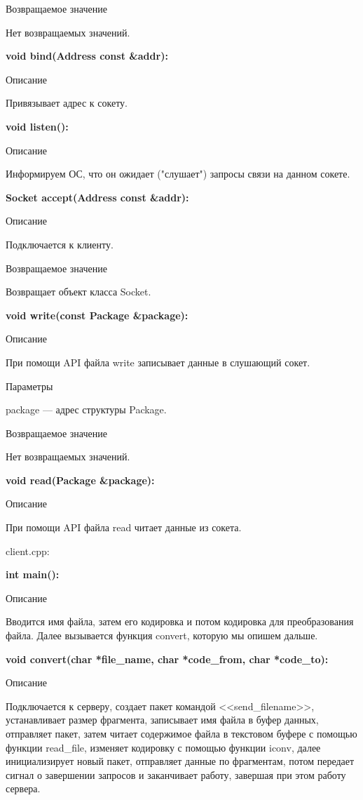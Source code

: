 \documentclass[a4paper,12pt]{extarticle}
\begin{document}
Возвращаемое значение 

Нет возвращаемых значений.

\textbf{void bind(Address const \&addr):}

Описание

Привязывает адрес к сокету.

\textbf{void listen():}

Описание

Информируем ОС, что он ожидает ("слушает") запросы связи на данном сокете.

\textbf{Socket accept(Address const \&addr):}

Описание

Подключается к клиенту.

Возвращаемое значение

Возвращает объект класса Socket.

\textbf{void write(const Package \&package):}

Описание

При помощи API файла write записывает данные в слушающий сокет.

Параметры

package --- адрес структуры Package.

Возвращаемое значение

Нет возвращаемых значений.

\textbf{void read(Package \&package):}

Описание

При помощи API файла read читает данные из сокета.

client.cpp:

\textbf{int main():}

Описание

Вводится имя файла, затем его кодировка и потом кодировка для преобразования файла. Далее вызывается функция convert, которую мы опишем дальше.

\textbf{void convert(char *file\_name, char *code\_from, char *code\_to):}

Описание

Подключается к серверу, создает пакет командой <<send\_filename>>, устанавливает размер фрагмента, записывает имя файла в буфер данных, отправляет пакет, затем читает содержимое файла в текстовом буфере с помощью функции read\_file, изменяет кодировку с помощью функции iconv, далее инициализирует новый пакет, отправляет данные по фрагментам, потом передает сигнал о завершении запросов и заканчивает работу, завершая при этом работу сервера.
\end{document}
